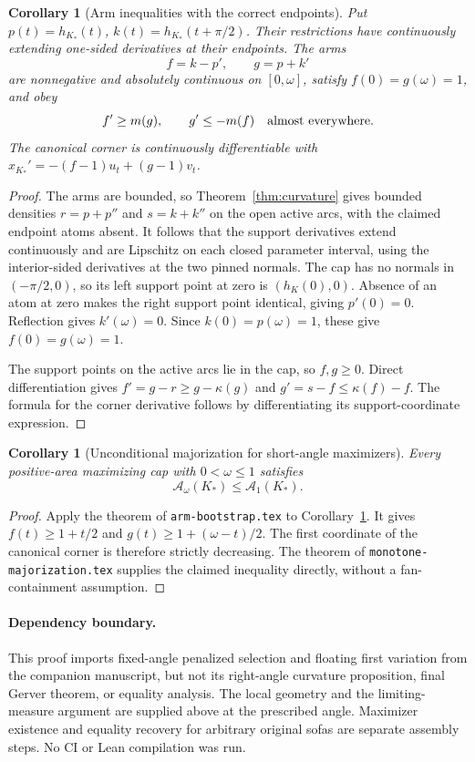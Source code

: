 \documentclass[11pt]{article}
\newtheorem{corollary}[theorem]{Corollary}
\begin{document}
\begin{corollary}[Arm inequalities with the correct endpoints]\label{cor:arms}
Put $p(t)=h_{K_*}(t)$, $k(t)=h_{K_*}(t+\pi/2)$. Their restrictions have continuously extending one-sided derivatives at their endpoints. The arms
\[
 f=k-p',\qquad g=p+k'
\]
are nonnegative and absolutely continuous on $[0,\omega]$, satisfy $f(0)=g(\omega)=1$, and obey
\[
 f'\ge m(g),\qquad g'\le-m(f)\quad\hbox{almost everywhere}.
\]
The canonical corner is continuously differentiable with
$x_{K_*}'=-(f-1)u_t+(g-1)v_t$.
\end{corollary}
\begin{proof}
The arms are bounded, so Theorem~\ref{thm:curvature} gives bounded densities $r=p+p''$ and $s=k+k''$ on the open active arcs, with the claimed endpoint atoms absent. It follows that the support derivatives extend continuously and are Lipschitz on each closed parameter interval, using the interior-sided derivatives at the two pinned normals. The cap has no normals in $(-\pi/2,0)$, so its left support point at zero is $(h_K(0),0)$. Absence of an atom at zero makes the right support point identical, giving $p'(0)=0$. Reflection gives $k'(\omega)=0$. Since $k(0)=p(\omega)=1$, these give $f(0)=g(\omega)=1$.

The support points on the active arcs lie in the cap, so $f,g\ge0$. Direct differentiation gives $f'=g-r\ge g-\kappa(g)$ and $g'=s-f\le\kappa(f)-f$. The formula for the corner derivative follows by differentiating its support-coordinate expression.
\end{proof}

\begin{corollary}[Unconditional majorization for short-angle maximizers]
Every positive-area maximizing cap with $0<\omega\le1$ satisfies
\[
 \mathcal A_\omega(K_*)\le\mathcal A_1(K_*).
\]
\end{corollary}
\begin{proof}
Apply the theorem of \texttt{arm-bootstrap.tex} to Corollary~\ref{cor:arms}. It gives $f(t)\ge1+t/2$ and $g(t)\ge1+(\omega-t)/2$. The first coordinate of the canonical corner is therefore strictly decreasing. The theorem of \texttt{monotone-majorization.tex} supplies the claimed inequality directly, without a fan-containment assumption.
\end{proof}

\paragraph{Dependency boundary.}
This proof imports fixed-angle penalized selection and floating first variation from the companion manuscript, but not its right-angle curvature proposition, final Gerver theorem, or equality analysis. The local geometry and the limiting-measure argument are supplied above at the prescribed angle. Maximizer existence and equality recovery for arbitrary original sofas are separate assembly steps. No CI or Lean compilation was run.
\end{document}
